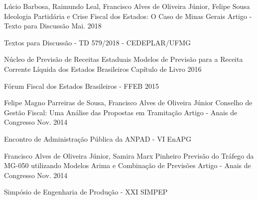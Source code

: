 \begin{cventries}

  \cventry
    {Lúcio Barbosa, Raimundo Leal, Francisco Alves de Oliveira Júnior, Felipe Sousa}
    {Ideologia Partidária e Crise Fiscal dos Estados: O Caso de Minas Gerais}
    {Artigo - Texto para Discussão}
    {Mai. 2018}
    {
      \begin{cvitems}
        \item {Textos para Discussão - TD 579/2018 - CEDEPLAR/UFMG}
      \end{cvitems}
    }

  \cventry
    {Núcleo de Previsão de Receitas Estaduais}
    {Modelos de Previsão para a Receita Corrente Líquida dos Estados Brasileiros}
    {Capítulo de Livro}
    {2016}
    {
      \begin{cvitems}
        \item {Fórum Fiscal dos Estados Brasileiros - FFEB 2015}
      \end{cvitems}
    }

  \cventry
    {Felipe Magno Parreiras de Sousa, Francisco Alves de Oliveira Júnior} 
    {Conselho de Gestão Fiscal: Uma Análise das Propostas em Tramitação}
    {Artigo - Anais de Congresso}
    {Nov. 2014}
    {
      \begin{cvitems}
        \item {Encontro de Administração Pública da ANPAD - VI EnAPG}
      \end{cvitems}
    }


  \cventry
    {Francisco Alves de Oliveira Júnior, Samira Marx Pinheiro}
    {Previsão do Tráfego da MG-050 utilizando Modelos Arima e Combinação de Previsões}
    {Artigo - Anais de Congresso}
    {Nov. 2014}
    {
      \begin{cvitems}
        \item {Simpósio de Engenharia de Produção - XXI SIMPEP}
      \end{cvitems}
    }


\end{cventries}